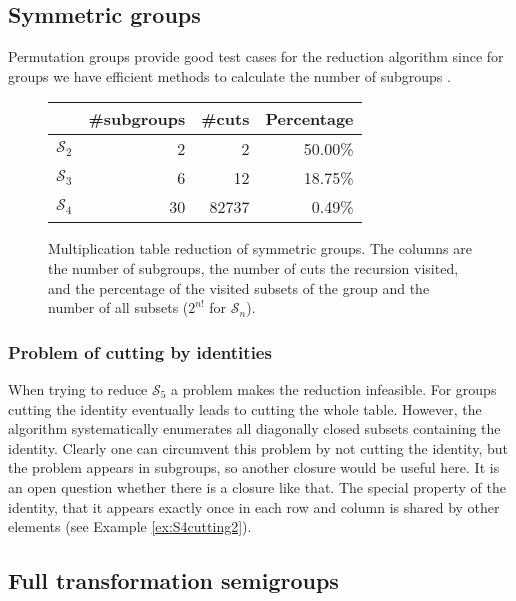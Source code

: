 \documentclass{amsart}
\newcommand{\cS}{{\mathcal S}}
\theoremstyle{plain}
\theoremstyle{definition}
\begin{document}
\subsection{Symmetric groups}

Permutation groups provide good test cases for the reduction algorithm since for groups we have efficient methods to calculate the number of subgroups \cite{CGTHandbook}.
\begin{figure}
\begin{center}
\begin{tabular}{|l|r|r|r|}
\hline
 & \#subgroups & \#cuts & Percentage\\
\hline
$\cS_2$ & 2 & 2 & 50.00\% \\
\hline
$\cS_3$ & 6 & 12 & 18.75\% \\
\hline
$\cS_4$ & 30 & 82737 & 0.49\% \\
\hline
\end{tabular}
\end{center}
\caption{Multiplication table reduction of symmetric groups. The columns are the number of subgroups, the number of cuts the recursion visited, and the percentage of the visited subsets of the group and the number of all subsets ($2^{n!}$ for $\cS_n$).}
\end{figure}

\subsubsection{Problem of cutting by identities}
When trying to reduce $\cS_5$ a problem makes the reduction infeasible. For groups  cutting the identity eventually leads to cutting the whole table. However, the algorithm systematically enumerates all diagonally closed subsets containing the identity. Clearly one can circumvent this problem by  not cutting the identity, but  the problem appears in subgroups, so another closure would be useful here. It is an open question whether there is a closure like that. The special property of the identity, that it appears exactly once in each row and column is shared by other elements (see Example \ref{ex:S4cutting2}).  

\subsection{Full transformation semigroups}
\end{document}
